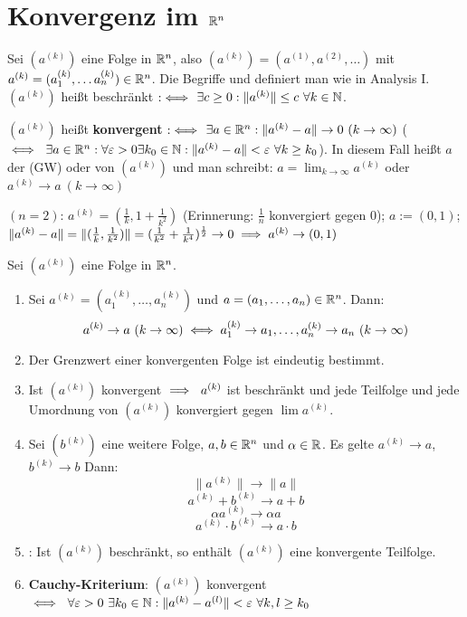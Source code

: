 \documentclass[a4paper,oneside,DIV15,BCOR12mm,chapterprefix=true,headings=onelinechapter]{scrbook}
\begin{document}
\chapter{Konvergenz im $\mathbb{R}^n$}

Sei $(a^{(k)})$ eine Folge in $\mathbb{R}^n$, also $(a^{(k)}) = ( a^{(1)}, a^{(2)}, \ldots ) $ mit $a^{(k)} = (a_1^{(k)}, \ldots a_n^{(k)}) \in \mathbb{R}^n$. Die Begriffe  und  definiert man wie in Analysis I. $(a^{(k)})$ heißt beschränkt $:\iff$ $\exists c\ge0: \|a^{(k)}\| \le c  \ \forall k\in\mathbb{N}$.

\begin{definition*}
$(a^{(k)})$ heißt \textbf{konvergent} $:\iff$ $\exists a\in\mathbb{R}^n: \|a^{(k)} - a\| \to 0 \ (k\to\infty)$ ($\iff\ \exists a\in\mathbb{R}^n: \forall \varepsilon>0\exists k_0 \in\mathbb{N}: \|a^{(k)} - a\|<\varepsilon \ \forall k\ge k_0$). In diesem Fall heißt $a$ der  (GW) oder  von $(a^{(k)})$ und man schreibt: $a=\lim_{k\to\infty}a^{(k)}$ oder $a^{(k)} \to a \ (k\to\infty)$
\end{definition*}

\begin{beispiel}
$(n=2)$: $a^{(k)} = (\frac{1}{k}, 1+\frac{1}{k^2})$ (Erinnerung: $\frac{1}{n}$ konvergiert gegen 0); $a := (0,1)$; $\|a^{(k)} - a \| = \|(\frac{1}{k} , \frac{1}{k^2})\| = (\frac{1}{k^2} + \frac{1}{k^4})^\frac{1}{2} \to 0 \implies a^{(k)} \to (0,1)$
\end{beispiel}
\begin{satz}[Konvergenz]
Sei $(a^{(k)})$ eine Folge in $\mathbb{R}^n$.
\begin{enumerate}
 \item Sei $a^{(k)} = (a_1^{(k)}, \ldots, a_n^{(k)})$ und $a = (a_1,\ldots,a_n)\in\mathbb{R}^n$. Dann:
 $$ a^{(k)} \to a \ (k\to\infty) \equizu a_1^{(k)} \to a_1, \ldots, a_n^{(k)} \to a_n \ (k\to\infty) $$
 \item Der Grenzwert einer konvergenten Folge ist eindeutig bestimmt.
 \item Ist $(a^{(k)})$ konvergent $\implies \ a^{(k)}$ ist beschränkt und jede Teilfolge und jede Umordnung von $(a^{(k)})$ konvergiert gegen $\lim a^{(k)}$.
 \item Sei $(b^{(k)})$ eine weitere Folge, $a,b\in\mathbb{R}^n$ und $\alpha\in\mathbb{R}$. Es gelte $a^{(k)}\to a$, $b^{(k)} \to b$ Dann: $$\|a^{(k)}\| \to \|a\|$$ $$a^{(k)} + b ^{(k)} \to a+b$$ $$\alpha a^{(k)} \to \alpha a$$ $$a^{(k)}\cdot b^{(k)} \to a\cdot b$$
 \item {}: Ist $(a^{(k)})$ beschränkt, so enthält $(a^{(k)})$ eine konvergente Teilfolge.
 \item {}\textbf{Cauchy-Kriterium}: $(a^{(k)})$ konvergent $\iff \ \forall\varepsilon>0\ \exists k_0\in\mathbb{N}: \|a^{(k)} - a^{(l)}\| <\varepsilon \ \forall k,l \ge k_0$
\end{enumerate}
\end{satz}
\end{document}
